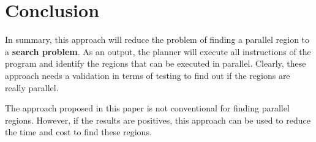\documentclass[letterpaper]{article}
\begin{document}
\section{Conclusion}

In summary, this approach will reduce the problem of finding a parallel region to a \textbf{search problem}. As an output, the planner will execute all instructions of the program and identify the regions that can be executed in parallel. Clearly, these approach needs a validation in terms of testing to find out if the regions are really parallel.

The approach proposed in this paper is not conventional for finding parallel regions. However, if the results are positives, this approach can be used to reduce the time and cost to find these regions.




\end{document}
